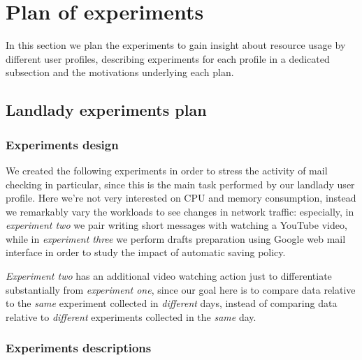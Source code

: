 \documentclass[10pt,a4paper]{article}
\begin{document}
    \newpage
    \section{Plan of experiments}
    \label{sec:plan-of-experiment}
    In this section we plan the experiments to gain insight about
    resource usage by different user profiles, describing experiments
    for each profile in a dedicated subsection and the motivations
    underlying each plan.

    \subsection{Landlady experiments plan}

    \subsubsection*{Experiments design }
    We created the following experiments in order to stress the
    activity of mail checking in particular, since this is the main
    task performed by our landlady user profile. Here we're not very
    interested on CPU and memory consumption, instead we remarkably
    vary the workloads to see changes in network traffic: especially,
    in \emph{experiment two} we pair writing short messages with
    watching a YouTube video, while in \emph{experiment three} we
    perform drafts preparation using Google web mail interface in
    order to study the impact of automatic saving policy.

    \emph{Experiment two} has an additional video watching action just
    to differentiate substantially from \emph{experiment one}, since
    our goal here is to compare data relative to the \emph{same}
    experiment collected in \emph{different} days, instead of
    comparing data relative to \emph{different} experiments collected
    in the \emph{same} day.

    \subsubsection*{Experiments descriptions}
    
\end{document}
